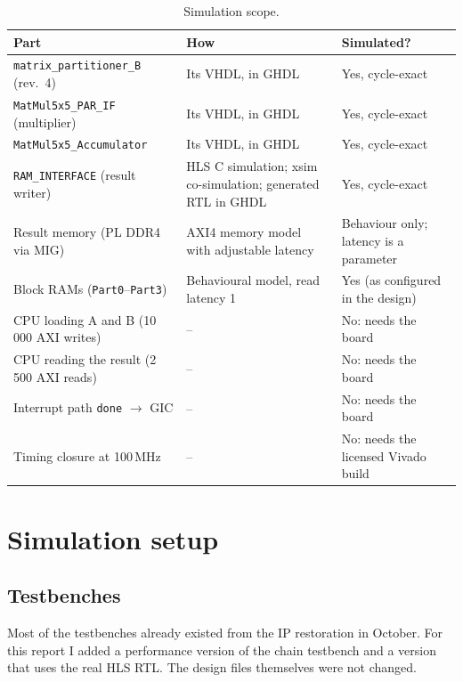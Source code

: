 \documentclass[11pt,a4paper]{article}
\newcommand{\code}[1]{\texttt{#1}}
\begin{document}
\begin{table}[h]
\centering
\begin{tabularx}{\textwidth}{@{}>{\raggedright\arraybackslash}p{5.2cm}Y>{\raggedright\arraybackslash}p{3.6cm}@{}}
\toprule
\textbf{Part} & \textbf{How} & \textbf{Simulated?} \\
\midrule
\code{matrix\_partitioner\_B} (rev.~4) & Its VHDL, in GHDL & Yes, cycle-exact \\
\code{MatMul5x5\_PAR\_IF} (multiplier) & Its VHDL, in GHDL & Yes, cycle-exact \\
\code{MatMul5x5\_Accumulator} & Its VHDL, in GHDL & Yes, cycle-exact \\
\code{RAM\_INTERFACE} (result writer) & HLS C simulation; xsim co-simulation; generated RTL in GHDL & Yes, cycle-exact \\
Result memory (PL DDR4 via MIG) & AXI4 memory model with adjustable latency & Behaviour only; latency is a parameter \\
Block RAMs (\code{Part0}--\code{Part3}) & Behavioural model, read latency 1 & Yes (as configured in the design) \\
CPU loading A and B (10\,000 AXI writes) & -- & No: needs the board \\
CPU reading the result (2\,500 AXI reads) & -- & No: needs the board \\
Interrupt path \code{done} $\rightarrow$ GIC & -- & No: needs the board \\
Timing closure at 100\,MHz & -- & No: needs the licensed Vivado build \\
\bottomrule
\end{tabularx}
\caption{Simulation scope.}
\label{tab:scope}
\end{table}

\section{Simulation setup}

\subsection{Testbenches}
Most of the testbenches already existed from the IP restoration in October. For this report I added a performance version of the chain testbench and a version that uses the real HLS RTL. The design files themselves were not changed.
\end{document}
